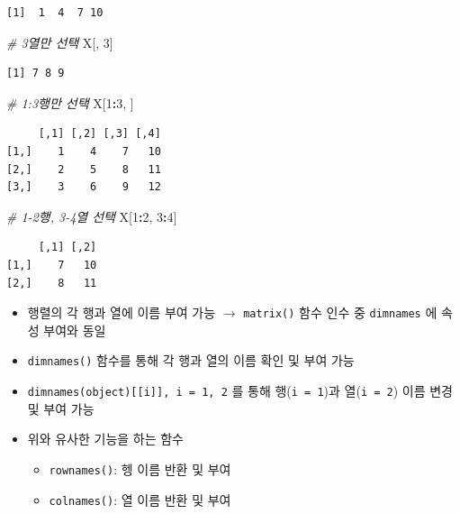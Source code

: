 \documentclass[
  11pt,
]{krantz}
\newenvironment{Shaded}{\begin{snugshade}}{\end{snugshade}}
\newcommand{\CommentTok}[1]{\textcolor[rgb]{0.37,0.37,0.37}{\textit{#1}}}
\newcommand{\DecValTok}[1]{\textcolor[rgb]{0.06,0.06,0.06}{#1}}
\newcommand{\NormalTok}[1]{#1}
\newcommand{\OperatorTok}[1]{\textcolor[rgb]{0.43,0.43,0.43}{\textbf{#1}}}
\providecommand{\tightlist}{%
  \setlength{\itemsep}{0pt}\setlength{\parskip}{0pt}}
\begin{document}
\begin{verbatim}
[1]  1  4  7 10
\end{verbatim}

\begin{Shaded}
\begin{Highlighting}[]
\CommentTok{# 3열만 선택}
\NormalTok{X[, }\DecValTok{3}\NormalTok{]}
\end{Highlighting}
\end{Shaded}

\begin{verbatim}
[1] 7 8 9
\end{verbatim}

\begin{Shaded}
\begin{Highlighting}[]
\CommentTok{# 1:3행만 선택}
\NormalTok{X[}\DecValTok{1}\OperatorTok{:}\DecValTok{3}\NormalTok{, ]}
\end{Highlighting}
\end{Shaded}

\begin{verbatim}
     [,1] [,2] [,3] [,4]
[1,]    1    4    7   10
[2,]    2    5    8   11
[3,]    3    6    9   12
\end{verbatim}

\begin{Shaded}
\begin{Highlighting}[]
\CommentTok{# 1-2행, 3-4열 선택}
\NormalTok{X[}\DecValTok{1}\OperatorTok{:}\DecValTok{2}\NormalTok{, }\DecValTok{3}\OperatorTok{:}\DecValTok{4}\NormalTok{]}
\end{Highlighting}
\end{Shaded}

\begin{verbatim}
     [,1] [,2]
[1,]    7   10
[2,]    8   11
\end{verbatim}

\normalsize

\begin{itemize}
\tightlist
\item
  행렬의 각 행과 열에 이름 부여 가능 \(\rightarrow\) \texttt{matrix()} 함수 인수 중 \texttt{dimnames} 에 속성 부여와 동일
\item
  \texttt{dimnames()} 함수를 통해 각 행과 열의 이름 확인 및 부여 가능
\item
  \texttt{dimnames(object){[}{[}i{]}{]},\ i\ =\ 1,\ 2} 를 통해 행(\texttt{i\ =\ 1})과 열(\texttt{i\ =\ 2}) 이름 변경 및 부여 가능
\item
  위와 유사한 기능을 하는 함수

  \begin{itemize}
  \tightlist
  \item
    \texttt{rownames()}: 헹 이름 반환 및 부여
  \item
    \texttt{colnames()}: 열 이름 반환 및 부여
  \end{itemize}
\end{itemize}
\end{document}
